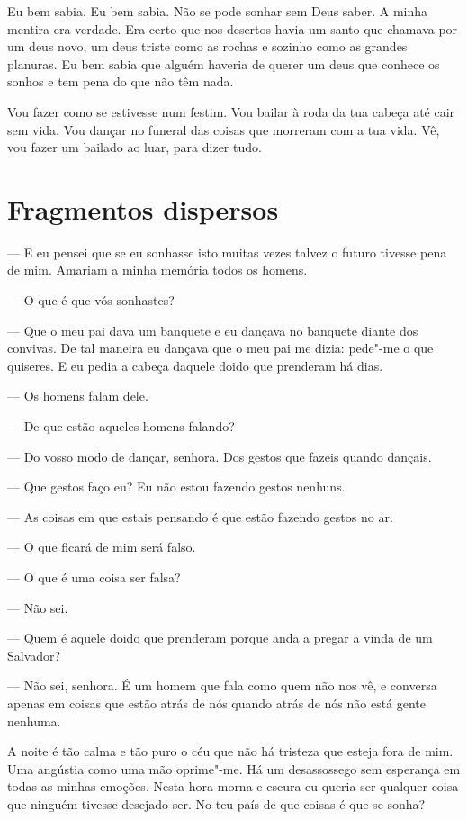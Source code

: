  Eu bem sabia. Eu bem sabia. Não se pode sonhar sem Deus
saber. A minha mentira era verdade. Era certo que nos desertos havia
um santo que chamava por um deus novo, um deus triste como as rochas
e sozinho como as grandes planuras. Eu bem sabia que alguém haveria
de querer um deus que conhece os sonhos e tem pena do que não têm
nada.

Vou fazer como se estivesse num festim. Vou bailar à roda da tua
cabeça até cair sem vida. Vou dançar no funeral das coisas que
morreram com a tua vida. Vê, vou fazer um bailado ao luar, para dizer
tudo.

\section{Fragmentos dispersos}

--- E eu pensei que se eu sonhasse isto muitas vezes talvez o futuro
tivesse pena de mim. Amariam a minha memória todos os homens.

--- O que é que vós sonhastes?

--- Que o meu pai dava um banquete e eu dançava no banquete diante dos
convivas. De tal maneira eu dançava que o meu pai me dizia: pede"-me o
que quiseres. E eu pedia a cabeça daquele doido que prenderam há
dias.

--- Os homens falam dele.

--- De que estão aqueles homens falando?

--- Do vosso modo de dançar, senhora. Dos gestos que fazeis quando
dançais.

--- Que gestos faço eu? Eu não estou fazendo gestos nenhuns.

--- As coisas em que estais pensando é que estão fazendo gestos no ar.

\asterisc 

--- O que ficará de mim será falso. 

--- O que é uma coisa ser falsa? 

--- Não sei.

\asterisc 

--- Quem é aquele doido que prenderam porque anda a pregar a vinda de
um Salvador?

--- Não sei, senhora. É um homem que fala como quem não nos vê, e
conversa apenas em coisas que estão atrás de nós quando atrás de nós
não está gente nenhuma.

 A noite é tão calma e tão puro o céu que não há tristeza
que esteja fora de mim. Uma angústia como uma mão oprime"-me. Há um
desassossego sem esperança em todas as minhas emoções. Nesta hora
morna e escura eu queria ser qualquer coisa que ninguém tivesse
desejado ser. No teu país de que coisas é que se sonha?

